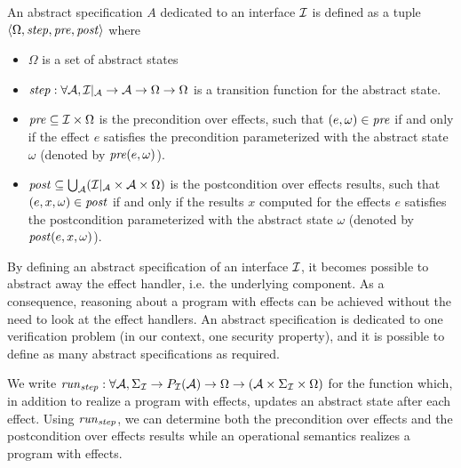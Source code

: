 \begin{definition} \label{def:freespec:abstract-specs}
  An abstract specification $A$ dedicated to an interface $\mathcal{I}$ is 
  defined as a tuple
  $\langle \Omega, \mathit{step}, \mathit{pre}, \mathit{post} \rangle$ where
  \begin{itemize}
  \item $\Omega$ is a set of abstract states
  \item
    $\mathit{step} : \forall \mathcal{A}, \mathcal{I}|_{\mathcal{A}} \rightarrow
    \mathcal{A} \rightarrow \Omega \rightarrow \Omega$ is a transition function
    for the abstract state.
  \item $\mathit{pre} \subseteq \mathcal{I} \times \Omega$ is the precondition over
    effects, such that $(e, \omega) \in \mathit{pre}$ if and only if the effect
    $e$ satisfies the precondition parameterized with the abstract state
    $\omega$ (denoted by $\mathit{pre}(e, \omega)$). 
  \item
    $\mathit{post} \subseteq \bigcup_{\mathcal{A}} (\mathcal{I}|_{\mathcal{A}}
    \times \mathcal{A} \times \Omega)$ is the postcondition over effects
    results, such that $(e, x, \omega) \in \mathit{post}$ if and only if the
    results $x$ computed for the effects $e$ satisfies the postcondition
    parameterized with the abstract state $\omega$ (denoted by
    $\mathit{post}(e, x, \omega)$). 
  \end{itemize}
\end{definition}

By defining an abstract specification of an interface $\mathcal{I}$, it becomes possible
to abstract away the effect handler, i.e. the underlying component.
%
As a consequence, reasoning about a program with effects can be achieved without
the need to look at the effect handlers.
%
An abstract specification is dedicated to one verification problem (in our
context, one security property), and it is possible to define as many
abstract specifications as required.

We write
$\mathit{run}_{\mathit{step}} : \forall \mathcal{A}, \Sigma_{\mathcal{I}} \rightarrow
P_{\mathcal{I}}(\mathcal{A}) \rightarrow \Omega \rightarrow (\mathcal{A} \times
\Sigma_{\mathcal{I}} \times \Omega)$ for the function which, in addition to realize a
program with effects, updates an abstract state after each effect.
%
Using $\mathit{run}_{\mathit{step}}$, we can determine both the precondition over
effects and the postcondition over effects results while an operational
semantics realizes a program with effects.

